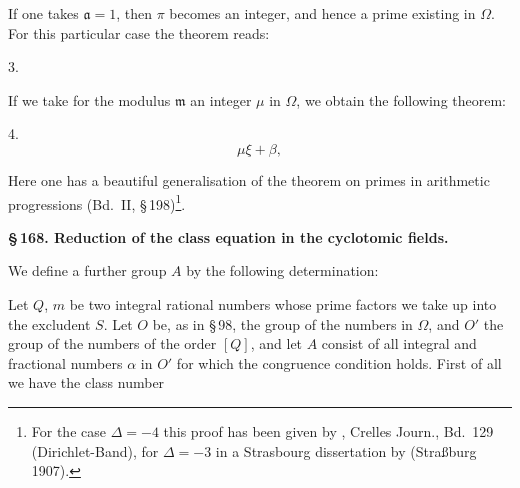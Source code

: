 
If one takes $\mathfrak{a} = 1$, then $\pi$ becomes an integer, and hence a prime existing in $\Omega$. For this particular case the theorem reads:

3. 

If we take for the modulus $\mathfrak{m}$ an integer $\mu$ in $\Omega$, we obtain the following theorem:

4. 
\[
\mu\xi + \beta,
\]

Here one has a beautiful generalisation of the theorem on primes in arithmetic progressions (Bd.\ II, \S\,198)\footnote{For the case $\Delta = -4$ this proof has been given by , Crelles Journ., Bd.\ 129 (Dirichlet-Band), for $\Delta = -3$ in a Strasbourg dissertation by  (Straßburg 1907).}.

\begin{center}
\textbf{\S\,168. Reduction of the class equation in the cyclotomic fields.}
\end{center}

We define a further group $A$ by the following determination:

Let $Q$, $m$ be two integral rational numbers whose prime factors we take up into the excludent $S$. Let $O$ be, as in \S\,98, the group of the numbers in $\Omega$, and $O'$ the group of the numbers of the order $[Q]$, and let $A$ consist of all integral and fractional numbers $\alpha$ in $O'$ for which the congruence condition
holds. First of all we have the class number
